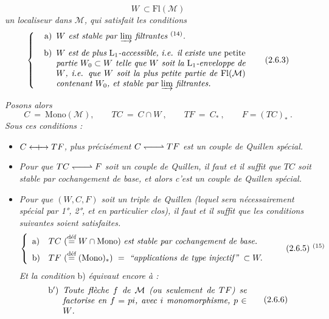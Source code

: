 \documentclass[11pt]{article}
\newcommand{\printedpage}[1]{\marginpar{\footnotesize p.~#1}}
\newcommand{\msp}[1]{\marginpar{\footnotesize [#1]}}
\newcommand{\Qcouple}{\mathrel{\leftarrow\mkern-9mu{+}\mkern-9mu\rightarrow}}
\newcommand{\Fl}{\mathrm{Fl}}
\newcommand{\deq}{\overset{\text{déf}}{=}}
\newcommand{\Mono}{\mathrm{Mono}}
\newcommand{\qpair}{\mathrel{\leftharpoondown\joinrel\relbar\joinrel\rightharpoonup}}
\begin{document}
\[ W \ \subset \Fl(\mathcal{M}) \tag*{(2.6.2)} \]
\textit{un localiseur dans $\mathcal{M}$, qui satisfait les conditions}
\[ \left\{ \begin{minipage}{0.72\textwidth}\itshape
\begin{itemize}[leftmargin=2.5em]
\item[\upshape a)] $W$ est stable par $\varinjlim$ filtrantes $^{\textup{(14)}}$.
\item[\upshape b)] $W$ est de plus $\mathrm{L}_1$-accessible, i.e. il existe une \textup{petite} partie $W_0 \subset W$ telle que $W$ soit la $\mathrm{L}_1$-enveloppe de $W$, i.e. que $W$ soit la plus petite partie de $\Fl(\mathcal{M})$ contenant $W_0$, et stable par $\varinjlim$ filtrantes. %
\end{itemize}
\end{minipage}\right. \tag*{(2.6.3)} \]

\printedpage{16}

\msp{page 26}
\textit{Posons alors}
\[ C \ = \ \Mono(\mathcal{M}), \qquad TC \ = \ C\cap W\ , \qquad TF \ = \ C_*\ , \qquad F = (TC)_*\ . \tag*{(2.6.4)} \]
\textit{Sous ces conditions :}
\begin{itemize}[leftmargin=2.5em]
\item[1°)] \textit{$C \Qcouple TF$, plus précisément $C \qpair TF$ est un couple de Quillen spécial.} %
\item[2°)] \textit{Pour que $TC \qpair F$ soit un couple de Quillen, il faut et il suffit que $TC$ soit stable par cochangement de base, et alors c'est un couple de Quillen spécial.} %
\item[3°)] \textit{Pour que $(W,C,F)$ soit un triple de Quillen (lequel sera nécessairement spécial par \textup{1°, 2°}, et en particulier clos), il faut et il suffit que les conditions suivantes soient satisfaites.}
\[ \left\{ \begin{array}{ll}
\text{a)} & TC\ (\deq W\cap\Mono)\ \text{\itshape est stable par cochangement de base.}\\[1ex]
\text{b)} & TF\ (\deq (\Mono)_*) \ = \ \text{\itshape “applications de type injectif”}\ \subset W.
\end{array}\right. \tag*{(2.6.5)~$^{(15)}$} \]
\textit{Et la condition} b) \textit{équivaut encore à :}
\[ \begin{minipage}{0.7\textwidth}
\begin{itemize}[leftmargin=2.5em]
\item[b$'$)] \textit{Toute flèche $f$ de $\mathcal{M}$ (ou seulement de $TF$) se factorise en $f = pi$, avec $i$ monomorphisme, $p \in W$.}
\end{itemize}
\end{minipage} \tag*{(2.6.6)} \]
\end{itemize}
\end{document}
